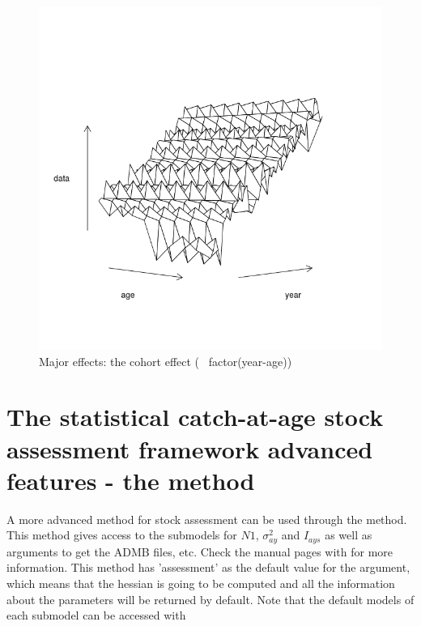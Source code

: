 \documentclass[a4paper,english,10pt]{article}\usepackage[]{graphicx}\usepackage[]{color}
\newenvironment{knitrout}{}{} %
\begin{document}
\begin{knitrout}
\color{fgcolor}\begin{figure}[H]

{\centering \includegraphics[width=.9\linewidth]{figure/majeffc-1} 

}

\caption[Major effects]{Major effects: the cohort effect (~ factor(year-age))}\label{fig:majeffc}
\end{figure}


\end{knitrout}

\section{The statistical catch-at-age stock assessment framework advanced features - the  method}

A more advanced method for stock assessment can be used through the  method. This method gives access to the submodels for $N1$, $\sigma^2_{ay}$ and $I_{ays}$ as well as arguments to get the ADMB files, etc. Check the manual pages with  for more information. This method has 'assessment' as the default value for the  argument, which means that the hessian is going to be computed and all the information about the parameters will be returned by default. Note that the default models of each submodel can be accessed with
\end{document}
